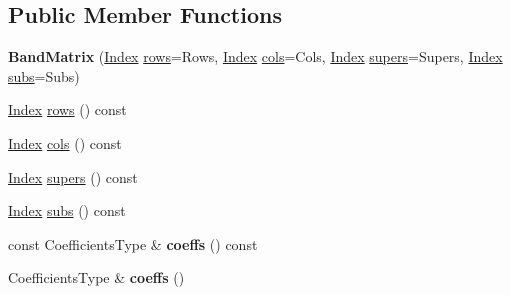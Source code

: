 \subsection*{Public Member Functions}
\begin{DoxyCompactItemize}
\item 
\mbox{\label{class_eigen_1_1internal_1_1_band_matrix_acd5340da8e6a2e830c2b5610a8bf2825}} 
{\bfseries Band\+Matrix} (\mbox{\hyperlink{struct_eigen_1_1_eigen_base_a554f30542cc2316add4b1ea0a492ff02}{Index}} \mbox{\hyperlink{class_eigen_1_1internal_1_1_band_matrix_a40c7b51bc27f4e875c2f709c5a551090}{rows}}=Rows, \mbox{\hyperlink{struct_eigen_1_1_eigen_base_a554f30542cc2316add4b1ea0a492ff02}{Index}} \mbox{\hyperlink{class_eigen_1_1internal_1_1_band_matrix_ac2e269d04f0162379e9201f2b69c4ea6}{cols}}=Cols, \mbox{\hyperlink{struct_eigen_1_1_eigen_base_a554f30542cc2316add4b1ea0a492ff02}{Index}} \mbox{\hyperlink{class_eigen_1_1internal_1_1_band_matrix_a0c7b513e0e6fb1df19a13beba8a5ef94}{supers}}=Supers, \mbox{\hyperlink{struct_eigen_1_1_eigen_base_a554f30542cc2316add4b1ea0a492ff02}{Index}} \mbox{\hyperlink{class_eigen_1_1internal_1_1_band_matrix_a8e685c7075a432979d72822db86e6d0e}{subs}}=Subs)
\item 
\mbox{\hyperlink{struct_eigen_1_1_eigen_base_a554f30542cc2316add4b1ea0a492ff02}{Index}} \mbox{\hyperlink{class_eigen_1_1internal_1_1_band_matrix_a40c7b51bc27f4e875c2f709c5a551090}{rows}} () const
\item 
\mbox{\hyperlink{struct_eigen_1_1_eigen_base_a554f30542cc2316add4b1ea0a492ff02}{Index}} \mbox{\hyperlink{class_eigen_1_1internal_1_1_band_matrix_ac2e269d04f0162379e9201f2b69c4ea6}{cols}} () const
\item 
\mbox{\hyperlink{struct_eigen_1_1_eigen_base_a554f30542cc2316add4b1ea0a492ff02}{Index}} \mbox{\hyperlink{class_eigen_1_1internal_1_1_band_matrix_a0c7b513e0e6fb1df19a13beba8a5ef94}{supers}} () const
\item 
\mbox{\hyperlink{struct_eigen_1_1_eigen_base_a554f30542cc2316add4b1ea0a492ff02}{Index}} \mbox{\hyperlink{class_eigen_1_1internal_1_1_band_matrix_a8e685c7075a432979d72822db86e6d0e}{subs}} () const
\item 
\mbox{\label{class_eigen_1_1internal_1_1_band_matrix_a2fe0c5fd36629be04b00c0182e50ff48}} 
const Coefficients\+Type \& {\bfseries coeffs} () const
\item 
\mbox{\label{class_eigen_1_1internal_1_1_band_matrix_a7e78f318a77804931ff8f0fe37ba26b7}} 
Coefficients\+Type \& {\bfseries coeffs} ()
\end{DoxyCompactItemize}
